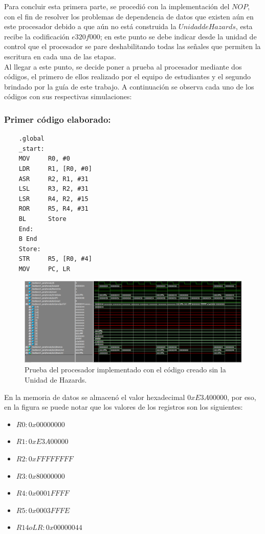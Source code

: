 Para concluir esta primera parte, se procedió con la implementación del $NOP$, con el fin de resolver los problemas de dependencia de datos que existen aún en este procesador debido a que aún no está construida la $Unidad de Hazards$, esta recibe la codificación $e320f000$; en este punto se debe indicar desde la unidad de control que el procesador se pare deshabilitando todas las señales que permiten la escritura en cada una de las etapas.\\

Al llegar a este punto, se decide poner a prueba al procesador mediante dos códigos, el primero de ellos realizado por el equipo de estudiantes y el segundo brindado por la guía de este trabajo. A continuación se observa cada uno de los códigos con sus respectivas simulaciones:
  
\subsubsection*{Primer código elaborado:}
\begin{lstlisting}
	.global
	_start:
	MOV 	R0, #0
	LDR 	R1, [R0, #0]
	ASR 	R2, R1, #31
	LSL 	R3, R2, #31
	LSR		R4, R2, #15
	ROR 	R5, R4, #31
	BL		Store
	End:
	B End
	Store:
	STR		R5, [R0, #4]
	MOV		PC, LR
\end{lstlisting}

\begin{figure}[H]
	\centering
	\includegraphics[width = \linewidth]{images/SimulacioncreadasinH.PNG}
	\caption{Prueba del procesador implementado con el código creado sin la Unidad de Hazards.}
	\label{fig:Código creado sin unidad de Hazards}
\end{figure}

En la memoria de datos se almacenó el valor hexadecimal $0xE3A00000$, por eso, en la figura se puede notar que los valores de los registros son los siguientes:

\begin{itemize}
	\item $R0:0x00000000$
	\item $R1:0xE3A00000$
	\item $R2:0xFFFFFFFF$
	\item $R3:0x80000000$
	\item $R4:0x0001FFFF$
	\item $R5:0x0003FFFE$
	\item $R14 o LR:0x00000044$
\end{itemize}

